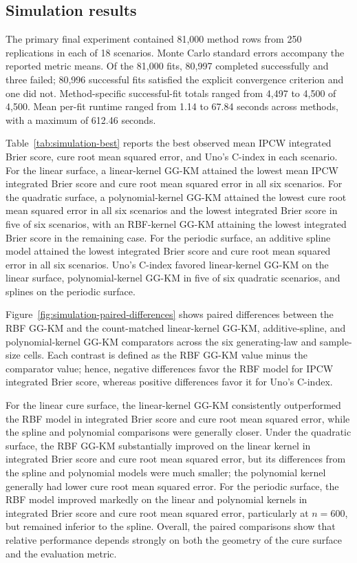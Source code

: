 \subsection{Simulation results}\label{sec:simulation-results}

The primary final experiment contained 81,000 method rows from
250 replications in each of 18 scenarios. Monte Carlo standard errors
accompany the reported metric means. Of the 81,000 fits, 80,997 completed
successfully and three failed; 80,996 successful fits satisfied the explicit
convergence criterion and one did not. Method-specific successful-fit totals ranged from
4,497 to 4,500 of 4,500. Mean per-fit runtime ranged from 1.14 to 67.84 seconds
across methods, with a maximum of 612.46 seconds.

Table~\ref{tab:simulation-best} reports the best observed mean IPCW
integrated Brier score, cure root mean squared error, and Uno's C-index in each
scenario. For the linear surface, a linear-kernel GG-KM attained the lowest
mean IPCW integrated Brier score and cure root mean squared error in all six
scenarios. For the quadratic surface, a polynomial-kernel GG-KM attained the
lowest cure root mean squared error in all six scenarios and the lowest
integrated Brier score in five of six scenarios, with an RBF-kernel GG-KM
attaining the lowest integrated Brier score in the remaining case. For the
periodic surface, an additive spline model attained the lowest integrated
Brier score and cure root mean squared error in all six scenarios. Uno's C-index favored linear-kernel GG-KM on the linear
surface, polynomial-kernel GG-KM in five of six quadratic scenarios,
and splines on the periodic surface.


Figure~\ref{fig:simulation-paired-differences} shows paired differences
between the RBF GG-KM and the count-matched linear-kernel GG-KM,
additive-spline, and polynomial-kernel GG-KM comparators across the six
generating-law and sample-size cells. Each contrast is defined as the RBF
GG-KM value minus the comparator value; hence, negative differences favor
the RBF model for IPCW integrated Brier score, whereas positive differences
favor it for Uno's C-index.

For the linear cure surface, the linear-kernel GG-KM consistently
outperformed the RBF model in integrated Brier score and cure root mean
squared error, while the spline and polynomial comparisons were generally
closer. Under the
quadratic surface, the RBF GG-KM substantially improved on the linear
kernel in integrated Brier score and cure root mean squared error, but its differences from the spline and
polynomial models were much smaller; the polynomial kernel generally had
lower cure root mean squared error. For the periodic surface, the RBF
model improved markedly on the linear and polynomial kernels in integrated
Brier score and cure root mean squared error, particularly at $n=600$,
but remained inferior to the spline. Overall, the paired comparisons
show that relative performance depends strongly on both the geometry of
the cure surface and the evaluation metric.

